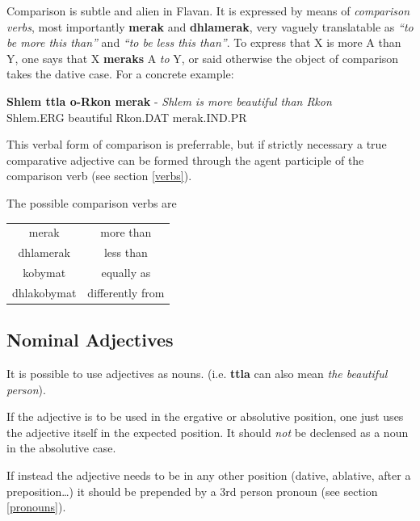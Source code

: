 \documentclass[10pt,oneside]{memoir}
\newcommand{\flav}[1]{  
    \rotatebox[origin=c]{270}{
		\begin{varwidth}{10 cm}
			{\centering \flavan  #1}
		\end{varwidth}
    }
    }
\newcommand{\Flav}[1]{{\Large \flav{#1}}}
\begin{document}
Comparison is subtle and alien in Flavan. It is expressed by means of \emph{comparison verbs}, most importantly \textbf{merak} and \textbf{dhlamerak}, very vaguely translatable as \emph{``to be more this than''} and \emph{``to be less this than''}. To express that X is more A than Y, one says that X \textbf{meraks} A \emph{to} Y, or said otherwise the object of comparison takes the dative case. For a concrete example:

\begin{center}
	\textbf{Shlem ttla o-Rkon merak} - \emph{Shlem is more beautiful than Rkon}\\
	Shlem.ERG beautiful Rkon.DAT merak.IND.PR\\
	\Flav{shlem ttlaa\\orkon merak}
\end{center}

This verbal form of comparison is preferrable, but if strictly necessary a true comparative adjective can be formed through the agent participle of the comparison verb (see section \ref{verbs}).

The possible comparison verbs are

\begin{center}
\begin{tabular}{c | c}
	merak & more than\\
	dhlamerak & less than\\
	kobymat & equally as\\
	dhlakobymat & differently from
\end{tabular}
\end{center}







\subsection{Nominal Adjectives}

It is possible to use adjectives as nouns. (i.e. \textbf{ttla} can also mean \emph{the beautiful person}). 

If the adjective is to be used in the ergative or absolutive position, one just uses the adjective itself in the expected position. It should \emph{not} be declensed as a noun in the absolutive case.

If instead the adjective needs to be in any other position (dative, ablative, after a preposition\ldots) it should be prepended by a 3rd person pronoun (see section \ref{pronouns}).
\end{document}
